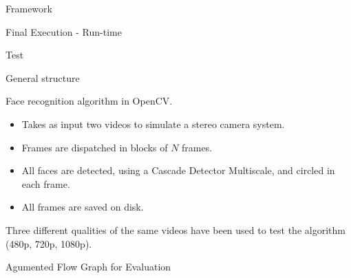 \documentclass[xcolor=dvipsnames]{beamer}
\begin{document}
\begin{section}{Framework}
\begin{frame}{\hskip 0.3cm Final Execution - Run-time}
\end{frame}











\end{section}
\begin{section}{Test}











\begin{frame}{\hskip 0.3cm General structure}

Face recognition algorithm in OpenCV.

\begin{itemize}

\item Takes as input two videos to simulate a stereo camera system.

\item Frames are dispatched in blocks of $N$ frames.
 
\item All faces are detected, using a Cascade Detector Multiscale, and circled in each frame.

\item All frames are saved on disk.


\end{itemize}

Three different qualities of the same videos have been used to test the algorithm (480p, 720p, 1080p).


\end{frame}
















\begin{frame}{\hskip 0.3cm Agumented Flow Graph for Evaluation}

\vskip -1cm

\begin{figure}
\hskip -1cm


\end{figure}
\end{frame}
\end{section}
\end{document}
